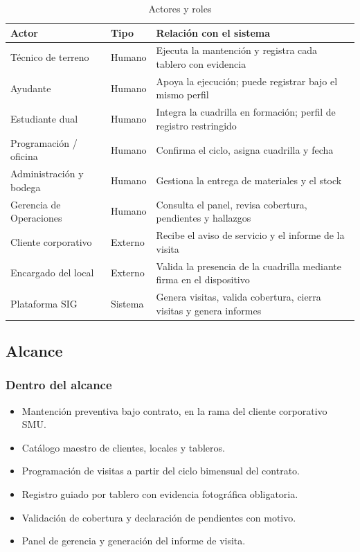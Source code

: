 \documentclass[10pt,letterpaper]{article}
\begin{document}
\begin{table}[H]
\centering
\small
\begin{tabular}{@{}p{3.6cm}p{2.2cm}p{8.8cm}@{}}
\toprule
\textbf{Actor} & \textbf{Tipo} & \textbf{Relación con el sistema} \\
\midrule
Técnico de terreno & Humano & Ejecuta la mantención y registra cada tablero con evidencia \\
Ayudante & Humano & Apoya la ejecución; puede registrar bajo el mismo perfil \\
Estudiante dual & Humano & Integra la cuadrilla en formación; perfil de registro restringido \\
Programación / oficina & Humano & Confirma el ciclo, asigna cuadrilla y fecha \\
Administración y bodega & Humano & Gestiona la entrega de materiales y el stock \\
Gerencia de Operaciones & Humano & Consulta el panel, revisa cobertura, pendientes y hallazgos \\
Cliente corporativo & Externo & Recibe el aviso de servicio y el informe de la visita \\
Encargado del local & Externo & Valida la presencia de la cuadrilla mediante firma en el dispositivo \\
Plataforma SIG & Sistema & Genera visitas, valida cobertura, cierra visitas y genera informes \\
\bottomrule
\end{tabular}
\caption{Actores y roles}
\end{table}

\subsection{Alcance}

\subsubsection*{Dentro del alcance}
\begin{itemize}
  \item Mantención preventiva bajo contrato, en la rama del cliente corporativo SMU.
  \item Catálogo maestro de clientes, locales y tableros.
  \item Programación de visitas a partir del ciclo bimensual del contrato.
  \item Registro guiado por tablero con evidencia fotográfica obligatoria.
  \item Validación de cobertura y declaración de pendientes con motivo.
  \item Panel de gerencia y generación del informe de visita.
\end{itemize}
\end{document}
